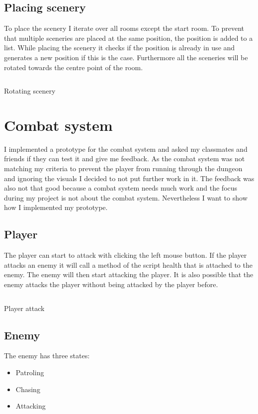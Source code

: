 \documentclass[a4paper,11pt,oneside]{scrreprt}
\begin{document}
\subsection{Placing scenery}
\label{subsection:placing-scenery}
To place the scenery I iterate over all rooms except the start room. To prevent that multiple sceneries are placed at the same position, the position is added to a list. While placing the scenery it checks if the position is already in use and generates a new position if this is the case. Furthermore all the sceneries will be rotated towards the centre point of the room.
\begin{listing}[ht]
    \inputminted[fontsize=\footnotesize,linenos]{csharp}{code/Scenery.cs}
    \caption[Rotating scenery]{Rotating scenery}
    \label{code:rotating-scenery}
\end{listing}

\section{Combat system}
\label{section:combat-system}
I implemented a prototype for the combat system and asked my classmates and friends if they can test it and give me feedback. As the combat system was not matching my criteria to prevent the player from running through the dungeon and ignoring the visuals I decided to not put further work in it. The feedback was also not that good because a combat system needs much work and the focus during my project is not about the combat system. Nevertheless I want to show how I implemented my prototype.

\subsection{Player}
\label{subsection:player}
The player can start to attack with clicking the left mouse button. If the player attacks an enemy it will call a method of the script health that is attached to the enemy. The enemy will then start attacking the player. It is also possible that the enemy attacks the player without being attacked by the player before. 
\begin{listing}[ht]
    \inputminted[fontsize=\footnotesize,linenos]{csharp}{code/Player.cs}
    \caption[Player attack]{Player attack}
    \label{code:player-attack}
\end{listing}

\subsection{Enemy}
\label{subsection:enemy}
The enemy has three states:
\begin{itemize}
\item Patroling
\item Chasing
\item Attacking
\end{itemize}
\end{document}
